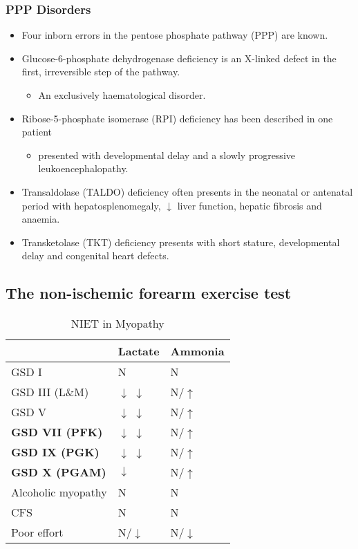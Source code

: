 \documentclass{scrartcl}
\begin{document}
\subsubsection{PPP Disorders}
\label{sec:org0a77c94}

\begin{itemize}
\item Four inborn errors in the pentose phosphate pathway (PPP) are known.
\item Glucose-6-phosphate dehydrogenase deficiency is an X-linked defect
in the first, irreversible step of the pathway.
\begin{itemize}
\item An exclusively haematological disorder.
\end{itemize}
\item Ribose-5-phosphate isomerase (RPI) deficiency has been described in one patient
\begin{itemize}
\item presented with developmental delay and a slowly progressive leukoencephalopathy.
\end{itemize}
\item Transaldolase (TALDO) deficiency often presents in the neonatal or
antenatal period with hepatosplenomegaly, \(\downarrow\) liver function,
hepatic fibrosis and anaemia.
\item Transketolase (TKT) deficiency presents with short stature,
developmental delay and congenital heart defects.
\end{itemize}

\subsection{The non-ischemic forearm exercise test}
\label{sec:orgd491e40}

\begin{table}[htbp]
\caption{\label{tab:orgc108909}
NIET in Myopathy}
\centering
\begin{tabular}{lll}
 & Lactate & Ammonia\\
\hline
GSD I & N & N\\
GSD III (L\&M) & \(\downarrow\) \(\downarrow\) & N/\(\uparrow\)\\
GSD V & \(\downarrow\) \(\downarrow\) & N/\(\uparrow\)\\
\textbf{GSD VII (PFK)} & \(\downarrow\) \(\downarrow\) & N/\(\uparrow\)\\
\textbf{GSD IX (PGK)} & \(\downarrow\) \(\downarrow\) & N/\(\uparrow\)\\
\textbf{GSD X (PGAM)} & \(\downarrow\) & N/\(\uparrow\)\\
Alcoholic myopathy & N & N\\
CFS & N & N\\
Poor effort & N/\(\downarrow\) & N/\(\downarrow\)\\
\end{tabular}
\end{table}
\end{document}
